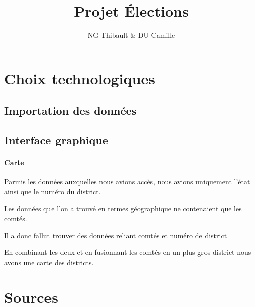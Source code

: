 \documentclass{article}
\title{\textbf{\huge{Projet Élections}}}
\author{NG Thibault \& DU Camille}
\begin{document}
    \maketitle

    \newpage
    \tableofcontents

    \newpage
    \section{Choix technologiques}
    \subsection{Importation des données}



    \newpage
    \subsection{Interface graphique}

    \paragraph{Carte}

    Parmis les données auxquelles nous avions accès, nous avions uniquement l'état ainsi que le numéro du district.

    Les données que l'on a trouvé en termes géographique ne contenaient que les comtés.

    Il a donc fallut trouver des données reliant comtés et numéro de district

    En combinant les deux et en fusionnant les comtés en un plus gros district nous avons une carte des districts.




    \section{Sources}\label{sec:sources}



    \nocite{*}
    
    
\end{document}
